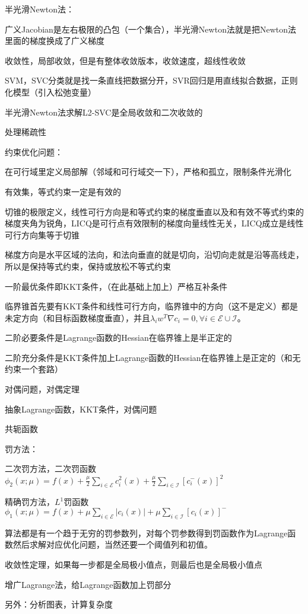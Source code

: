 半光滑Newton法：

广义Jacobian是左右极限的凸包（一个集合），半光滑Newton法就是把Newton法里面的梯度换成了广义梯度

收敛性，局部收敛，但是有整体收敛版本，收敛速度，超线性收敛

SVM，SVC分类就是找一条直线把数据分开，SVR回归是用直线拟合数据，正则化模型（引入松弛变量）

半光滑Newton法求解L2-SVC是全局收敛和二次收敛的

处理稀疏性

约束优化问题：

在可行域里定义局部解（邻域和可行域交一下），严格和孤立，限制条件光滑化

有效集，等式约束一定是有效的

切锥的极限定义，线性可行方向是和等式约束的梯度垂直以及和有效不等式约束的梯度夹角为锐角，LICQ是可行点有效限制的梯度向量线性无关，LICQ成立是线性可行方向集等于切锥

梯度方向是水平区域的法向，和法向垂直的就是切向，沿切向走就是沿等高线走，所以是保持等式约束，保持或放松不等式约束

一阶最优条件即KKT条件，（在此基础上加上）严格互补条件

临界锥首先要有KKT条件和线性可行方向，临界锥中的方向（这不是定义）都是未定方向（和目标函数梯度垂直），并且$\lambda_i w^T \nabla c_i = 0, \forall i \in \mathcal{E} \cup \mathcal{I}$。

二阶必要条件是Lagrange函数的Hessian在临界锥上是半正定的

二阶充分条件是KKT条件加上Lagrange函数的Hessian在临界锥上是正定的（和无约束一个套路）

对偶问题，对偶定理

抽象Lagrange函数，KKT条件，对偶问题

共轭函数

罚方法：

二次罚方法，二次罚函数$\phi_2(x; \mu)=f(x)+\frac{\mu}{2} \sum_{i \in \mathcal{E}}c_{i}^2(x)+\frac{\mu}{2} \sum_{i \in \mathcal{I}}\left[c_{i}^{-}(x)\right]^2$

精确罚方法，$L^1$罚函数$\phi_1(x; \mu)=f(x)+\mu \sum_{i \in \mathcal{E}}\left|c_{i}(x)\right|+\mu \sum_{i \in \mathcal{I}}\left[c_{i}(x)\right]^{-}$

算法都是有一个趋于无穷的罚参数列，对每个罚参数得到罚函数作为Lagrange函数然后求解对应优化问题，当然还要一个阈值列和初值。

收敛性定理，如果每一步都是全局极小值点，则最后也是全局极小值点

增广Lagrange法，给Lagrange函数加上罚部分

另外：分析图表，计算复杂度

